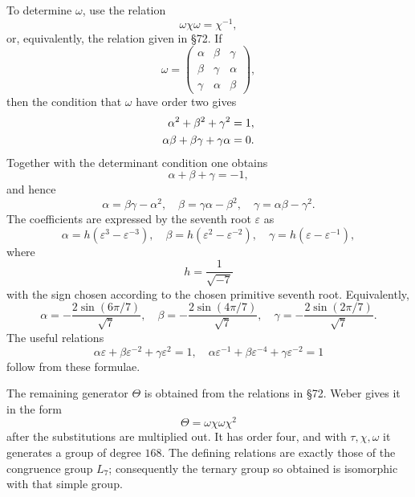 \documentclass[11pt,a4paper]{book}
\begin{document}
To determine $\omega$, use the relation
\begin{equation}
 \omega\chi\omega=\chi^{-1},
\end{equation}
or, equivalently, the relation given in \S 72.  If
\begin{equation}
 \omega=\begin{pmatrix}
 \alpha&\beta&\gamma\\
 \beta&\gamma&\alpha\\
 \gamma&\alpha&\beta
 \end{pmatrix},
\end{equation}
then the condition that $\omega$ have order two gives
\begin{align}
 \alpha^2+\beta^2+\gamma^2&=1,\notag\\
 \alpha\beta+\beta\gamma+\gamma\alpha&=0.
\end{align}
Together with the determinant condition one obtains
\begin{equation}
 \alpha+\beta+\gamma=-1,
\end{equation}
and hence
\begin{equation}
 \alpha=\beta\gamma-\alpha^2,
 \quad
 \beta=\gamma\alpha-\beta^2,
 \quad
 \gamma=\alpha\beta-\gamma^2.
\end{equation}
The coefficients are expressed by the seventh root $\varepsilon$ as
\begin{equation}
 \alpha=h(\varepsilon^3-\varepsilon^{-3}),
 \quad
 \beta=h(\varepsilon^2-\varepsilon^{-2}),
 \quad
 \gamma=h(\varepsilon-\varepsilon^{-1}),
\end{equation}
where
\begin{equation}
 h=\frac{1}{\sqrt{-7}}
\end{equation}
with the sign chosen according to the chosen primitive seventh root.  Equivalently,
\begin{equation}
 \alpha=-\frac{2\sin(6\pi/7)}{\sqrt7},
 \quad
 \beta=-\frac{2\sin(4\pi/7)}{\sqrt7},
 \quad
 \gamma=-\frac{2\sin(2\pi/7)}{\sqrt7}.
\end{equation}
The useful relations
\begin{equation}
 \alpha\varepsilon+\beta\varepsilon^{-2}+\gamma\varepsilon^2=1,
 \quad
 \alpha\varepsilon^{-1}+\beta\varepsilon^{-4}+\gamma\varepsilon^{-2}=1
\end{equation}
follow from these formulae.

The remaining generator $\Theta$ is obtained from the relations in \S 72.  Weber gives it in the form
\begin{equation}
 \Theta=\omega\chi\omega\chi^2
\end{equation}
after the substitutions are multiplied out.  It has order four, and with $\tau,
\chi,
\omega$ it generates a group of degree $168$.  The defining relations are exactly those of the congruence group $L_7$; consequently the ternary group so obtained is isomorphic with that simple group.
\end{document}

